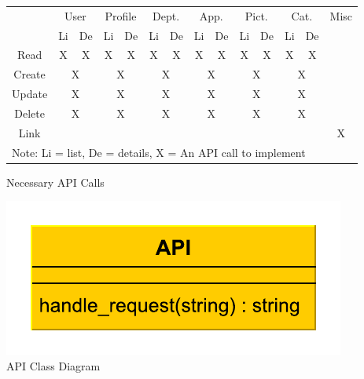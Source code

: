 \begin{figure}[ht]
\begin{tabular}[ht]{c|c|c|c|c|c|c|c|c|c|c|c|c|c|}
\cline{2-14}
&\multicolumn{2}{c|}{User}&\multicolumn{2}{c|}{Profile}&\multicolumn{2}{c|}{Dept.}&\multicolumn{2}{c|}{App.}&\multicolumn{2}{c|}{Pict.}&\multicolumn{2}{c|}{Cat.}&Misc \\
\cline{2-14}
& Li & De & Li & De & Li & De & Li & De & Li & De & Li & De & \\
\hline
\multicolumn{1}{|c|}{Read} & X & X & X & X & X & X & X & X & X & X & X & X & \\
\hline
\multicolumn{1}{|c|}{Create} & \multicolumn{2}{c|}{X} & \multicolumn{2}{c|}{X} & \multicolumn{2}{c|}{X} & \multicolumn{2}{c|}{X} &\multicolumn{2}{c|}{X} & \multicolumn{2}{c|}{X} & \\
\hline
\multicolumn{1}{|c|}{Update} & \multicolumn{2}{c|}{X} & \multicolumn{2}{c|}{X} & \multicolumn{2}{c|}{X} & \multicolumn{2}{c|}{X} &\multicolumn{2}{c|}{X} & \multicolumn{2}{c|}{X} & \\
\hline
\multicolumn{1}{|c|}{Delete} & \multicolumn{2}{c|}{X} & \multicolumn{2}{c|}{X} & \multicolumn{2}{c|}{X} & \multicolumn{2}{c|}{X} &\multicolumn{2}{c|}{X} & \multicolumn{2}{c|}{X} & \\
\hline
\multicolumn{1}{|c|}{Link} &\multicolumn{2}{c|}{}&\multicolumn{2}{c|}{}&\multicolumn{2}{c|}{}&\multicolumn{2}{c|}{}&\multicolumn{2}{c|}{}&\multicolumn{2}{c|}{}& X \\
\hline
\multicolumn{14}{l}{Note: Li = list, De = details, X = An API call to implement}
\end{tabular}
\caption{Necessary API Calls}
\label{fig:call_list}
\end{figure}

\begin{figure}[ht]
\begin{center}
\includegraphics[scale=0.6]{img/api.pdf}
\caption{API Class Diagram}
\label{fig:uml_api}
\end{center}
\end{figure}


